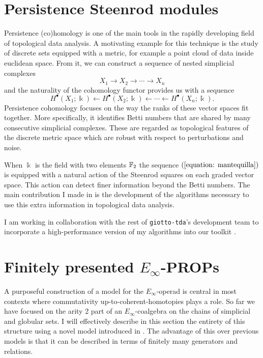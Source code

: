 \section{Persistence Steenrod modules}

Persistence (co)homology is one of the main tools in the rapidly developing field of topological data analysis. A motivating example for this technique is the study of discrete sets equipped with a metric, for example a point cloud of data inside euclidean space. From it, we can construct a sequence of nested simplicial complexes
\begin{equation*}
X_1 \to X_2 \to \cdots \to X_n
\end{equation*}
and the naturality of the cohomology functor provides us with a sequence
\begin{equation} \label{equation: mantequilla}
H^\bullet(X_1; \Bbbk) \leftarrow H^\bullet(X_2; \Bbbk) \leftarrow \cdots \leftarrow H^\bullet(X_n; \Bbbk).
\end{equation}
Persistence cohomology focuses on the way the ranks of these vector spaces fit together. More specifically, it identifies Betti numbers that are shared by many consecutive simplicial complexes. These are regarded as topological features of the discrete metric space which are robust with respect to perturbations and noise.

When $\Bbbk$ is the field with two elements ${\mathbb{F}_2}$ the sequence $(\ref{equation: mantequilla})$ is equipped with a natural action of the Steenrod squares on each graded vector space. This action can detect finer information beyond the Betti numbers. The main contribution I made in \cite{medina2018persistence} is the development of the algorithms necessary to use this extra information in topological data analysis.

I am working in collaboration with the rest of \texttt{giotto-tda}'s development team to incorporate a high-performance version of my algorithms into our toolkit \cite{medina2021giotto}.

\section{Finitely presented $E_\infty$-PROPs}

A purposeful construction of a model for the $E_\infty$-operad is central in most contexts where commutativity up-to-coherent-homotopies plays a role. So far we have focused on the arity 2 part of an $E_\infty$-coalgebra on the chains of simplicial and globular sets. I will effectively describe in this section the entirety of this structure using a novel model introduced in \cite{medina2020prop1}. The advantage of this over previous models \cite{berger2004combinatorial, mcclure2003multivariable, kriz1995operads} is that it can be described in terms of finitely many generators and relations.


